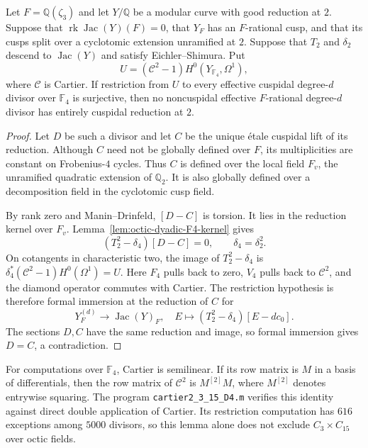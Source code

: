 \begin{lemma}\label{lem:octic-F4-Cartier}
Let $F=\mathbb Q(\zeta_3)$ and let $Y/\mathbb Q$ be a
modular curve with good reduction at $2$. Suppose that
$\operatorname{rk}\operatorname{Jac}(Y)(F)=0$, that $Y_F$
has an $F$-rational cusp, and that its cusps split over a
cyclotomic extension unramified at $2$. Suppose that $T_2$
and $\delta_2$ descend to $\operatorname{Jac}(Y)$ and
satisfy Eichler--Shimura. Put
\[
 U=(\mathcal C^2-1)H^0(Y_{\mathbb F_4},\Omega^1),
\]
where $\mathcal C$ is Cartier. If restriction from $U$
to every effective cuspidal degree-$d$ divisor over
$\mathbb F_4$ is surjective, then no noncuspidal
effective $F$-rational degree-$d$ divisor has entirely
cuspidal reduction at $2$.
\end{lemma}
\begin{proof}
Let $D$ be such a divisor and let $C$ be the unique \'etale
cuspidal lift of its reduction. Although $C$ need not be
globally defined over $F$, its multiplicities are constant
on Frobenius-$4$ cycles. Thus $C$ is defined over the local
field $F_v$, the unramified quadratic extension of
$\mathbb Q_2$. It is also globally defined over a
decomposition field in the cyclotomic cusp field.

By rank zero and Manin--Drinfeld, $[D-C]$ is torsion.
It lies in the reduction kernel over $F_v$.
Lemma~\ref{lem:octic-dyadic-F4-kernel} gives
\[
 (T_2^2-\delta_4)[D-C]=0,
 \qquad \delta_4=\delta_2^2.
\]
On cotangents in characteristic two, the image of
$T_2^2-\delta_4$ is
$\delta_4^*(\mathcal C^2-1)H^0(\Omega^1)=U$.
Here $F_4$ pulls back to zero, $V_4$ pulls back to
$\mathcal C^2$, and the diamond operator commutes with
Cartier. The restriction hypothesis is therefore formal
immersion at the reduction of $C$ for
\[
 Y_F^{(d)}\longrightarrow\operatorname{Jac}(Y)_F,
 \quad E\longmapsto(T_2^2-\delta_4)[E-dc_0].
\]
The sections $D,C$ have the same reduction and image,
so formal immersion gives $D=C$, a contradiction.
\end{proof}

For computations over $\mathbb F_4$, Cartier is semilinear.
If its row matrix is $M$ in a basis of differentials, then
the row matrix of $\mathcal C^2$ is $M^{[2]}M$, where
$M^{[2]}$ denotes entrywise squaring. The program
\texttt{cartier2\_3\_15\_D4.m} verifies this identity
against direct double application of Cartier. Its
restriction computation has $616$ exceptions among
$5000$ divisors, so this lemma alone does not exclude
$C_3\times C_{15}$ over octic fields.
